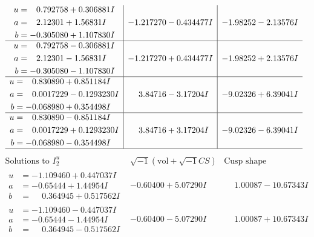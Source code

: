 \documentclass[1p]{elsarticle_modified}
\theoremstyle{definition}
\newcommand{\I}{\sqrt{-1}}
\begin{document}
$$\begin{array}{c|c|c}
\begin{aligned}
u &= \phantom{-}0.792758 + 0.306881 I \\
a &= \phantom{-}2.12301 + 1.56831 I \\
b &= -0.305080 + 1.107830 I\end{aligned}
 & -1.217270 - 0.434477 I & -1.98252 - 2.13576 I \\ \hline\begin{aligned}
u &= \phantom{-}0.792758 - 0.306881 I \\
a &= \phantom{-}2.12301 - 1.56831 I \\
b &= -0.305080 - 1.107830 I\end{aligned}
 & -1.217270 + 0.434477 I & -1.98252 + 2.13576 I \\ \hline\begin{aligned}
u &= \phantom{-}0.830890 + 0.851184 I \\
a &= \phantom{-}0.0017229 - 0.1293230 I \\
b &= -0.068980 + 0.354498 I\end{aligned}
 & \phantom{-}3.84716 - 3.17204 I & -9.02326 + 6.39041 I \\ \hline\begin{aligned}
u &= \phantom{-}0.830890 - 0.851184 I \\
a &= \phantom{-}0.0017229 + 0.1293230 I \\
b &= -0.068980 - 0.354498 I\end{aligned}
 & \phantom{-}3.84716 + 3.17204 I & -9.02326 - 6.39041 I\\
 \hline 
 \end{array}$$\newpage$$\begin{array}{c|c|c}  
\text{Solutions to }I^u_{2}& \I (\text{vol} + \sqrt{-1}CS) & \text{Cusp shape}\\
 \hline 
\begin{aligned}
u &= -1.109460 + 0.447037 I \\
a &= -0.65444 + 1.44954 I \\
b &= \phantom{-}0.364945 + 0.517562 I\end{aligned}
 & -0.60400 + 5.07290 I & \phantom{-}1.00087 - 10.67343 I \\ \hline\begin{aligned}
u &= -1.109460 - 0.447037 I \\
a &= -0.65444 - 1.44954 I \\
b &= \phantom{-}0.364945 - 0.517562 I\end{aligned}
 & -0.60400 - 5.07290 I & \phantom{-}1.00087 + 10.67343 I \\ \hline\begin{aligned}

\end{aligned}
\end{array}$$
\end{document}
